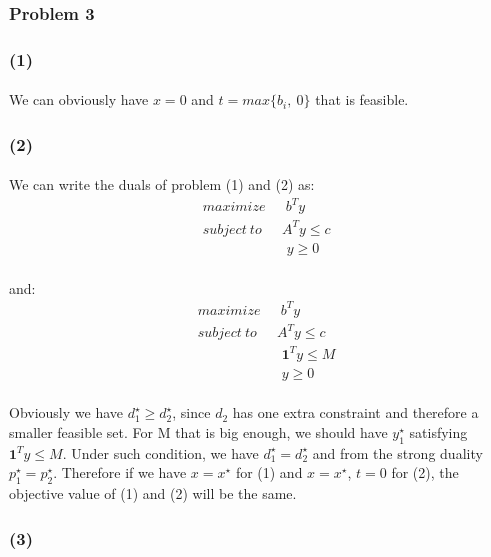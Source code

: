 \subsubsection*{Problem 3}
\subsubsection*{(1)}
\paragraph{}
We can obviously have $x=0$ and $t=max\{b_i, \  0\}$ that is feasible.
\subsubsection*{(2)}
\paragraph{}
We can write the duals of problem (1) and (2) as:
\begin{align*}
& maximize \quad \ \ b^Ty\\
& subject \ to \quad \ \  A^Ty \leq c\\
&\qquad \qquad \quad \quad y \geq 0
\end{align*}
\paragraph{}
and:
\begin{align*}
& maximize \quad \ \ b^Ty\\
& subject \ to \quad \ \  A^Ty \leq c\\
&\qquad \qquad \quad \quad \textbf{1}^Ty \leq M\\
&\qquad \qquad \quad \quad y \geq 0
\end{align*}
\paragraph{}
Obviously we have $d_1^\star \geq d_2^\star$, since $d_2$ has one extra constraint and therefore a smaller feasible set. For M that is big enough, we should have $y_1^\star$ satisfying $\textbf{1}^Ty \leq M$. Under such condition, we have  $d_1^\star = d_2^\star$ and from the strong duality $p_1^\star = p_2^\star$. Therefore if we have $x=x^\star$ for (1) and $x=x^\star$, $t=0$ for (2), the objective value of (1) and (2) will be the same.
\subsubsection*{(3)}
